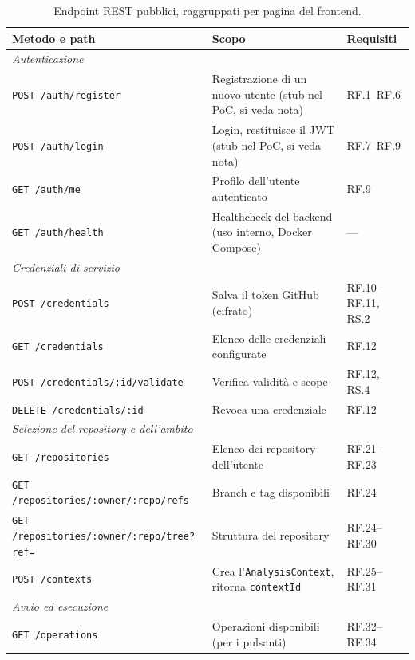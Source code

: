 \documentclass[11pt,a4paper]{article}
\begin{document}
\begin{table}[H]
\centering
\caption{Endpoint REST pubblici, raggruppati per pagina del frontend.}
\label{tab:rest}
\vspace{2mm}
\renewcommand{\arraystretch}{1.15}
\begin{tabularx}{\textwidth}{|l|X|l|}
\hline
\textbf{Metodo e path} & \textbf{Scopo} & \textbf{Requisiti} \\ \hline
\multicolumn{3}{|l|}{\textit{Autenticazione}} \\ \hline
\texttt{POST /auth/register} & Registrazione di un nuovo utente (stub nel PoC, si veda nota) & RF.1--RF.6 \\ \hline
\texttt{POST /auth/login} & Login, restituisce il JWT (stub nel PoC, si veda nota) & RF.7--RF.9 \\ \hline
\texttt{GET /auth/me} & Profilo dell'utente autenticato & RF.9 \\ \hline
\texttt{GET /auth/health} & Healthcheck del backend (uso interno, Docker Compose) & --- \\ \hline
\multicolumn{3}{|l|}{\textit{Credenziali di servizio}} \\ \hline
\texttt{POST /credentials} & Salva il token GitHub (cifrato) & RF.10--RF.11, RS.2 \\ \hline
\texttt{GET /credentials} & Elenco delle credenziali configurate & RF.12 \\ \hline
\texttt{POST /credentials/:id/validate} & Verifica validità e scope & RF.12, RS.4 \\ \hline
\texttt{DELETE /credentials/:id} & Revoca una credenziale & RF.12 \\ \hline
\multicolumn{3}{|l|}{\textit{Selezione del repository e dell'ambito}} \\ \hline
\texttt{GET /repositories} & Elenco dei repository dell'utente & RF.21--RF.23 \\ \hline
\texttt{GET /repositories/\allowbreak{}:owner/\allowbreak{}:repo/refs} & Branch e tag disponibili & RF.24 \\ \hline
\texttt{GET /repositories/\allowbreak{}:owner/\allowbreak{}:repo/tree?ref=} & Struttura del repository & RF.24--RF.30 \\ \hline
\texttt{POST /contexts} & Crea l'\texttt{AnalysisContext}, ritorna \texttt{contextId} & RF.25--RF.31 \\ \hline
\multicolumn{3}{|l|}{\textit{Avvio ed esecuzione}} \\ \hline
\texttt{GET /operations} & Operazioni disponibili (per i pulsanti) & RF.32--RF.34 \\ \hline

\end{tabularx}
\end{table}
\end{document}
